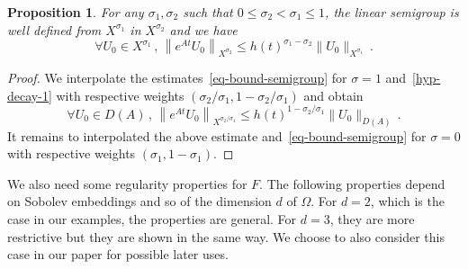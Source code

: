 \documentclass[11pt]{article}
\newtheorem{prop}[theo]{Proposition}
\theoremstyle{definition}
\numberwithin{equation}{section}
\numberwithin{figure}{section}
\numberwithin{table}{section}
\let\oldforall\forall
\renewcommand*{\forall}{\mathrel{\oldforall}}
\begin{document}
\begin{prop}\label{prop-decay-interpole}
For any $\sigma_1,\sigma_2$ such that $0\leq \sigma_2<\sigma_1 \leq 1$, the linear semigroup is well defined from $X^{\sigma_1}$ in $X^{\sigma_2}$ and we have
\[
\forall U_0\in X^{\sigma_1}\,,\,\left\|e^{At}U_0\right\|_{X^{\sigma_2}} \leq
h(t)^{\sigma_1-\sigma_2} \|U_0\|_{X^{\sigma_1}}\,.
\]
\end{prop}
\begin{proof}
We interpolate the estimates~\eqref{eq-bound-semigroup} for $\sigma=1$ and~\eqref{hyp-decay-1} with respective weights $(\sigma_2/\sigma_1,1-\sigma_2/\sigma_1)$ and obtain
\[
\forall U_0\in D(A)\,,\,\left\|e^{At}U_0\right\|_{X^{\sigma_2/\sigma_1}} \leq
h(t)^{1-\sigma_2/\sigma_1}\|U_0\|_{D(A)}\,.
\]
It remains to interpolated the above estimate and~\eqref{eq-bound-semigroup} for $\sigma=0$ with respective weights $(\sigma_1,1-\sigma_1)$.
\end{proof}



We also need some regularity properties for $F$. The following properties depend on Sobolev embeddings and so of the dimension $d$ of $\Omega$. For $d=2$, which is the case in our examples, the properties are general. For $d=3$, they are more restrictive but they are shown in the same way. We choose to also consider this case in our paper for possible later uses.
\end{document}
